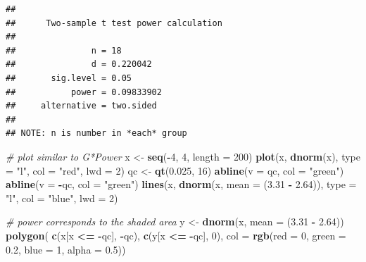 \documentclass[
  12pt,
]{book}
\newenvironment{Shaded}{\begin{snugshade}}{\end{snugshade}}
\newcommand{\CommentTok}[1]{\textcolor[rgb]{0.56,0.35,0.01}{\textit{#1}}}
\newcommand{\DataTypeTok}[1]{\textcolor[rgb]{0.13,0.29,0.53}{#1}}
\newcommand{\DecValTok}[1]{\textcolor[rgb]{0.00,0.00,0.81}{#1}}
\newcommand{\FloatTok}[1]{\textcolor[rgb]{0.00,0.00,0.81}{#1}}
\newcommand{\KeywordTok}[1]{\textcolor[rgb]{0.13,0.29,0.53}{\textbf{#1}}}
\newcommand{\NormalTok}[1]{#1}
\newcommand{\OperatorTok}[1]{\textcolor[rgb]{0.81,0.36,0.00}{\textbf{#1}}}
\newcommand{\StringTok}[1]{\textcolor[rgb]{0.31,0.60,0.02}{#1}}
\begin{document}
\begin{verbatim}
## 
##      Two-sample t test power calculation 
## 
##               n = 18
##               d = 0.220042
##       sig.level = 0.05
##           power = 0.09833902
##     alternative = two.sided
## 
## NOTE: n is number in *each* group
\end{verbatim}

\begin{Shaded}
\begin{Highlighting}[]
\CommentTok{\# plot similar to G*Power}
\NormalTok{x \textless{}{-}}\StringTok{ }\KeywordTok{seq}\NormalTok{(}\OperatorTok{{-}}\DecValTok{4}\NormalTok{, }\DecValTok{4}\NormalTok{, }\DataTypeTok{length =} \DecValTok{200}\NormalTok{)}
\KeywordTok{plot}\NormalTok{(x, }\KeywordTok{dnorm}\NormalTok{(x), }\DataTypeTok{type =} \StringTok{"l"}\NormalTok{, }\DataTypeTok{col =} \StringTok{"red"}\NormalTok{, }\DataTypeTok{lwd =} \DecValTok{2}\NormalTok{)}
\NormalTok{qc \textless{}{-}}\StringTok{ }\KeywordTok{qt}\NormalTok{(}\FloatTok{0.025}\NormalTok{, }\DecValTok{16}\NormalTok{)}
\KeywordTok{abline}\NormalTok{(}\DataTypeTok{v =}\NormalTok{ qc, }\DataTypeTok{col =} \StringTok{"green"}\NormalTok{)}
\KeywordTok{abline}\NormalTok{(}\DataTypeTok{v =} \OperatorTok{{-}}\NormalTok{qc, }\DataTypeTok{col =} \StringTok{"green"}\NormalTok{)}
\KeywordTok{lines}\NormalTok{(x, }\KeywordTok{dnorm}\NormalTok{(x, }\DataTypeTok{mean =}\NormalTok{ (}\FloatTok{3.31} \OperatorTok{{-}}\StringTok{ }\FloatTok{2.64}\NormalTok{)), }\DataTypeTok{type =} \StringTok{"l"}\NormalTok{, }\DataTypeTok{col =} \StringTok{"blue"}\NormalTok{, }\DataTypeTok{lwd =} \DecValTok{2}\NormalTok{)}

\CommentTok{\# power corresponds to the shaded area}
\NormalTok{y \textless{}{-}}\StringTok{ }\KeywordTok{dnorm}\NormalTok{(x, }\DataTypeTok{mean =}\NormalTok{ (}\FloatTok{3.31} \OperatorTok{{-}}\StringTok{ }\FloatTok{2.64}\NormalTok{))}
\KeywordTok{polygon}\NormalTok{(}
  \KeywordTok{c}\NormalTok{(x[x }\OperatorTok{\textless{}=}\StringTok{ }\OperatorTok{{-}}\NormalTok{qc], }\OperatorTok{{-}}\NormalTok{qc), }\KeywordTok{c}\NormalTok{(y[x }\OperatorTok{\textless{}=}\StringTok{ }\OperatorTok{{-}}\NormalTok{qc], }\DecValTok{0}\NormalTok{),}
  \DataTypeTok{col =} \KeywordTok{rgb}\NormalTok{(}\DataTypeTok{red =} \DecValTok{0}\NormalTok{, }\DataTypeTok{green =} \FloatTok{0.2}\NormalTok{, }\DataTypeTok{blue =} \DecValTok{1}\NormalTok{, }\DataTypeTok{alpha =} \FloatTok{0.5}\NormalTok{))}
\end{Highlighting}
\end{Shaded}
\end{document}
